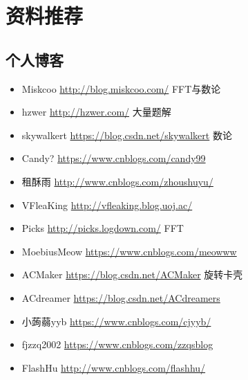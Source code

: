 \chapter{资料推荐}
\section{个人博客}
\begin{itemize}
	\item Miskcoo \url{http://blog.miskcoo.com/} FFT与数论
	\item hzwer \url{http://hzwer.com/} 大量题解
    \item skywalkert \url{https://blog.csdn.net/skywalkert} 数论
    \item Candy? \url{https://www.cnblogs.com/candy99}
    \item 租酥雨 \url{http://www.cnblogs.com/zhoushuyu/}
    \item VFleaKing \url{http://vfleaking.blog.uoj.ac/}
    \item Picks \url{http://picks.logdown.com/} FFT
    \item MoebiusMeow \url{https://www.cnblogs.com/meowww}
    \item ACMaker \url{https://blog.csdn.net/ACMaker} 旋转卡壳
    \item ACdreamer \url{https://blog.csdn.net/ACdreamers}
    \item 小蒟蒻yyb \url{https://www.cnblogs.com/cjyyb/}
    \item fjzzq2002 \url{https://www.cnblogs.com/zzqsblog}
    \item FlashHu \url{http://www.cnblogs.com/flashhu/}
\end{itemize}
